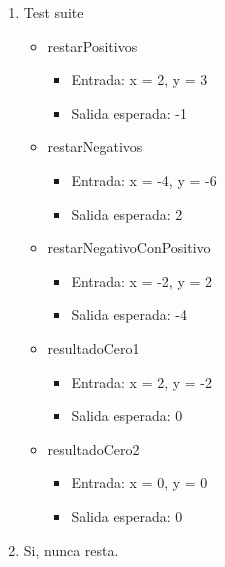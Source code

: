 \documentclass{article}
\begin{document}
\begin{enumerate}
    \item Test suite
        \begin{itemize}
            \item restarPositivos
                \begin{itemize}
                    \item Entrada: x = 2, y = 3
                    \item Salida esperada: -1
                \end{itemize}
            \item restarNegativos
                \begin{itemize}
                    \item Entrada: x = -4, y = -6
                    \item Salida esperada: 2
                \end{itemize}
            \item restarNegativoConPositivo
                \begin{itemize}
                    \item Entrada: x = -2, y = 2
                    \item Salida esperada: -4
                \end{itemize}
            \item resultadoCero1
                \begin{itemize}
                    \item Entrada: x = 2, y = -2
                    \item Salida esperada: 0
                \end{itemize}
            \item resultadoCero2
                \begin{itemize}
                    \item Entrada: x = 0, y = 0
                    \item Salida esperada: 0
                \end{itemize}
        \end{itemize}

    \item Si, nunca resta.
\end{enumerate}
\end{document}
